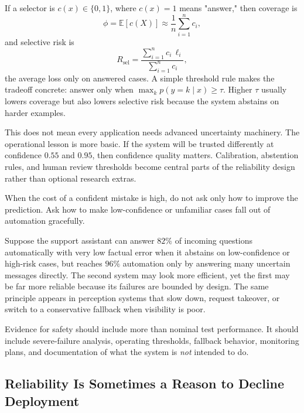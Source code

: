 If a selector is $c(x)\in\{0,1\}$, where $c(x)=1$ means "answer," then coverage is
\[
\phi=\mathbb{E}[c(X)] \approx \frac{1}{n}\sum_{i=1}^n c_i,
\]
and selective risk is
\[
R_{\mathrm{sel}}=\frac{\sum_{i=1}^n c_i\,\ell_i}{\sum_{i=1}^n c_i},
\]
the average loss only on answered cases. A simple threshold rule makes the tradeoff concrete: answer only when $\max_k p(y=k\mid x)\ge \tau$. Higher $\tau$ usually lowers coverage but also lowers selective risk because the system abstains on harder examples.

This does not mean every application needs advanced uncertainty machinery. The operational lesson is more basic. If the system will be trusted differently at confidence $0.55$ and $0.95$, then confidence quality matters. Calibration, abstention rules, and human review thresholds become central parts of the reliability design rather than optional research extras.

\begin{decisionbox}
When the cost of a confident mistake is high, do not ask only how to improve the prediction. Ask how to make low-confidence or unfamiliar cases fall out of automation gracefully.
\end{decisionbox}

\begin{example}
Suppose the support assistant can answer $82\%$ of incoming questions automatically with very low factual error when it abstains on low-confidence or high-risk cases, but reaches $96\%$ automation only by answering many uncertain messages directly. The second system may look more efficient, yet the first may be far more reliable because its failures are bounded by design. The same principle appears in perception systems that slow down, request takeover, or switch to a conservative fallback when visibility is poor.
\end{example}

\begin{evidencebox}
Evidence for safety should include more than nominal test performance. It should include severe-failure analysis, operating thresholds, fallback behavior, monitoring plans, and documentation of what the system is \emph{not} intended to do.
\end{evidencebox}

\subsection{Reliability Is Sometimes a Reason to Decline Deployment}

